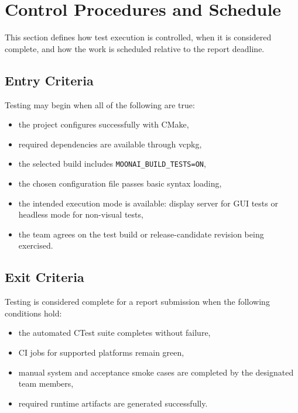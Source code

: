 \section{Control Procedures and Schedule}
\label{sec:control}

This section defines how test execution is controlled, when it is considered complete, and
how the work is scheduled relative to the report deadline.

\subsection{Entry Criteria}

Testing may begin when all of the following are true:

\begin{itemize}[nosep]
	\item the project configures successfully with CMake,
	\item required dependencies are available through vcpkg,
	\item the selected build includes \texttt{MOONAI\_BUILD\_TESTS=ON},
	\item the chosen configuration file passes basic syntax loading,
	\item the intended execution mode is available: display server for GUI tests or headless mode for non-visual tests,
	\item the team agrees on the test build or release-candidate revision being exercised.
\end{itemize}

\subsection{Exit Criteria}

Testing is considered complete for a report submission when the following conditions hold:

\begin{itemize}[nosep]
	\item the automated CTest suite completes without failure,
	\item CI jobs for supported platforms remain green,
	\item manual system and acceptance smoke cases are completed by the designated team members,
	\item required runtime artifacts are generated successfully.
\end{itemize}

